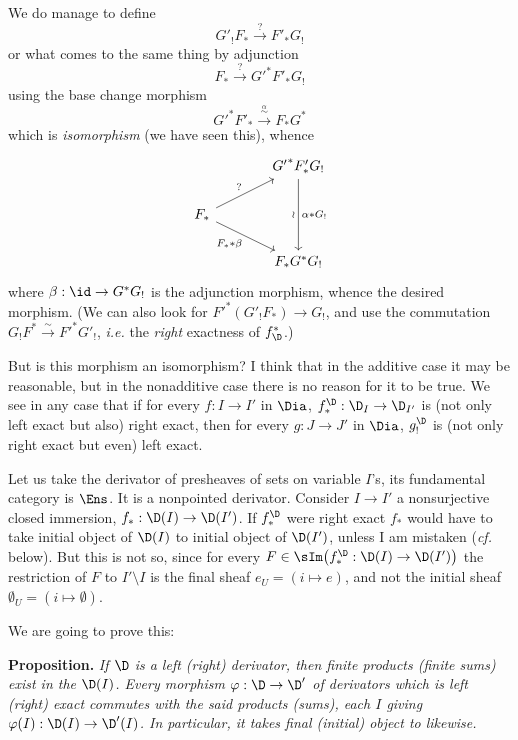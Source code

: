
We do manage to define
\[
G'_!F_* \xrightarrow{?} F'_*G_!
\]
or what comes to the same thing by adjunction
\[
F_* \xrightarrow{?} {G'}^*F'_*G_!
\]
using the base change morphism
\[
{G'}^*F'_* \xrightarrow{\overset{\alpha}{\sim}} F_*G^*
\]
which is \textit{isomorphism} (we have seen this), whence
\[
\begin{tikzcd}[column sep=large, row sep=normal]
& {G'}^*F'_*G_! \arrow[dd, "\wr"', "\alpha * G_!"] \\
F_* \arrow[ur, "?"] \arrow[dr, "F_* * \beta"'] & \\
& F_*G^*G_!
\end{tikzcd}
\]
where $\beta : \id \to G^*G_!$ is the adjunction morphism, whence the desired morphism. (We can also look for ${F'}^*(G'_!F_*) \to G_!$, and use the commutation $G_!F^* \overset{\sim}{\to} {F'}^*G'_!$, \textit{i.e.} the \textit{right} exactness of $f^*_{\D}$.)


But is this morphism an isomorphism? I think that in the additive case it may be reasonable, but in the nonadditive case there is no reason for it to be true. We see in any case that if for every $f : I \to I'$ in $\Dia$, $f^{\D}_* : \D_I \to \D_{I'}$ is (not only left exact but also) right exact, then for every $g : J \to J'$ in $\Dia$, $g^{\D}_!$ is (not only right exact but even) left exact. %

Let us take the derivator of presheaves of sets on variable $I$'s, its fundamental category is $\Ens$. It is a nonpointed derivator. Consider $I \to I'$ a nonsurjective closed immersion, $f_* : \D(I) \to \D(I')$. If $f^{\D}_*$ were right exact $f_*$ would have to take initial object of $\D(I)$ to initial object of $\D(I')$, unless I am mistaken (\textit{cf.} below). But this is not so, since for every $F \in \sIm\bigl(f^{\D}_* : \D(I) \to \D(I')\bigr)$ the restriction of $F$ to $I' \setminus I$ is the final sheaf $e_U = (i \mapsto e)$, and not the initial sheaf $\emptyset_U = (i \mapsto \emptyset)$.

We are going to prove this:

\textbf{Proposition.} \textit{If $\D$ is a left (right) derivator, then finite products (finite sums) exist in the $\D(I)$. Every morphism $\varphi : \D \to \D'$ of derivators which is left (right) exact commutes with the said products (sums), each $I$ giving $\varphi(I) : \D(I) \to \D'(I)$. In particular, it takes final (initial) object to likewise.}

